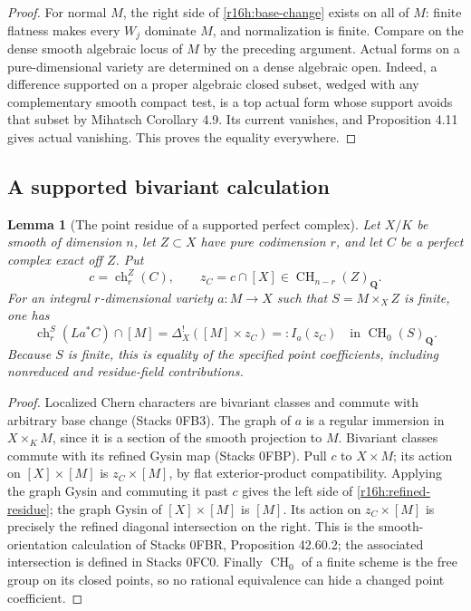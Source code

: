 \documentclass[11pt,a4paper]{article}
\newtheorem{lemma}[theorem]{Lemma}
\theoremstyle{definition}
\theoremstyle{remark}
\numberwithin{equation}{section}
\begin{document}
\begin{proof}
For normal $M$, the right side of \eqref{r16h:base-change} exists on all
of $M$: finite flatness makes every $W_j$ dominate $M$, and normalization
is finite. Compare on the dense smooth algebraic locus of $M$ by the
preceding argument. Actual forms on a pure-dimensional variety are
determined on a dense algebraic open. Indeed, a difference supported
on a proper algebraic closed subset, wedged with any complementary
smooth compact test, is a top actual form whose support avoids that
subset by Mihatsch Corollary 4.9. Its current vanishes, and Proposition
4.11 gives actual vanishing. This proves the equality everywhere.
\end{proof}

\subsection{A supported bivariant calculation}

\begin{lemma}[The point residue of a supported perfect complex]
\label{r16h:algebraic-residue}
Let $X/K$ be smooth of dimension $n$, let $Z\subset X$ have pure
codimension $r$, and let $C$ be a perfect complex exact off $Z$. Put
\[
 c=\operatorname{ch}_r^Z(C),\qquad z_C=c\cap[X]\in\operatorname{CH}_{n-r}(Z)_{\mathbf Q}.
\]
For an integral $r$-dimensional variety $a:M\to X$ such that
$S=M\times_X Z$ is finite, one has
\[
 \operatorname{ch}_r^S(La^*C)\cap[M]
       =\Delta_X^!([M]\times z_C)
       =:I_a(z_C)\quad\text{in }\operatorname{CH}_0(S)_{\mathbf Q}.
 \tag{H16.3}\label{r16h:refined-residue}
\]
Because $S$ is finite, this is equality of the specified point
coefficients, including nonreduced and residue-field contributions.
\end{lemma}

\begin{proof}
Localized Chern characters are bivariant classes and commute with
arbitrary base change (Stacks 0FB3). The graph of $a$ is a regular
immersion in $X\times_K M$, since it is a section of the smooth
projection to $M$. Bivariant classes commute with its refined Gysin map
(Stacks 0FBP). Pull $c$ to $X\times M$; its action on $[X]\times[M]$
is $z_C\times[M]$, by flat exterior-product compatibility. Applying
the graph Gysin and commuting it past $c$ gives the left side of
\eqref{r16h:refined-residue}; the graph Gysin of $[X]\times[M]$ is
$[M]$. Its action on $z_C\times[M]$ is precisely the refined diagonal
intersection on the right. This is the smooth-orientation calculation
of Stacks 0FBR, Proposition 42.60.2; the associated intersection is
defined in Stacks 0FC0. Finally $\operatorname{CH}_0$ of a finite
scheme is the free group on its closed points, so no rational
equivalence can hide a changed point coefficient.
\end{proof}
\end{document}
